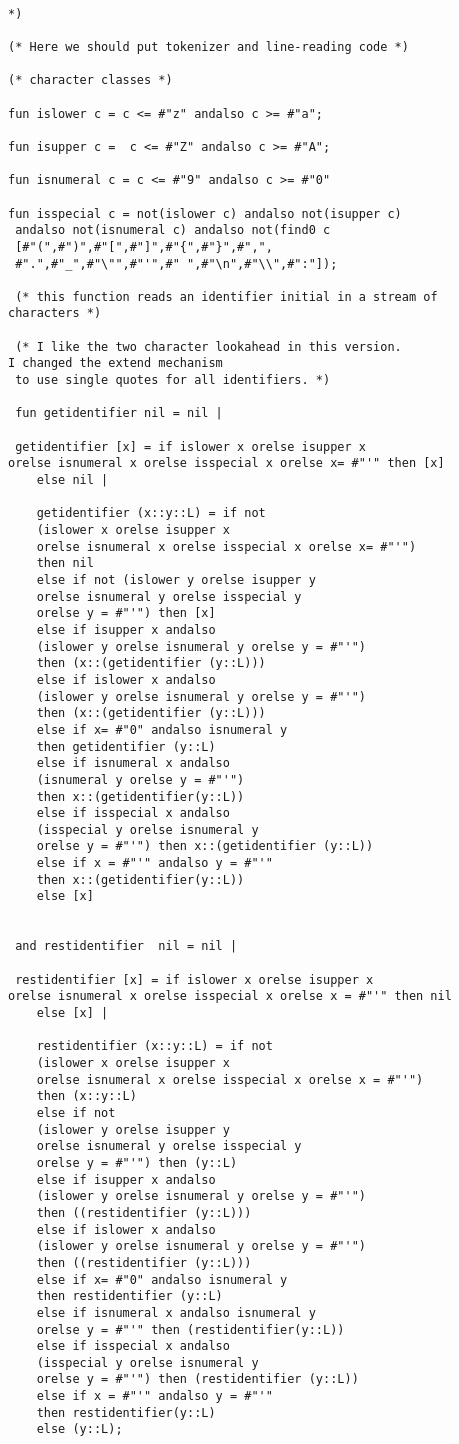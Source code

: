 \documentclass[12pt]{article}
\begin{document}
\begin{verbatim}

*)

(* Here we should put tokenizer and line-reading code *)

(* character classes *)

fun islower c = c <= #"z" andalso c >= #"a";

fun isupper c =  c <= #"Z" andalso c >= #"A";

fun isnumeral c = c <= #"9" andalso c >= #"0"

fun isspecial c = not(islower c) andalso not(isupper c)
 andalso not(isnumeral c) andalso not(find0 c
 [#"(",#")",#"[",#"]",#"{",#"}",#",",
 #".",#"_",#"\"",#"'",#" ",#"\n",#"\\",#":"]);
 
 (* this function reads an identifier initial in a stream of characters *)
 
 (* I like the two character lookahead in this version.  
I changed the extend mechanism
 to use single quotes for all identifiers. *)
 
 fun getidentifier nil = nil |
 
 getidentifier [x] = if islower x orelse isupper x 
orelse isnumeral x orelse isspecial x orelse x= #"'" then [x]
    else nil |
	
	getidentifier (x::y::L) = if not 
	(islower x orelse isupper x 
	orelse isnumeral x orelse isspecial x orelse x= #"'") 
	then nil
	else if not (islower y orelse isupper y 
	orelse isnumeral y orelse isspecial y 
	orelse y = #"'") then [x]
	else if isupper x andalso 
	(islower y orelse isnumeral y orelse y = #"'")
	then (x::(getidentifier (y::L)))
	else if islower x andalso 
	(islower y orelse isnumeral y orelse y = #"'")
	then (x::(getidentifier (y::L)))
	else if x= #"0" andalso isnumeral y 
	then getidentifier (y::L)
	else if isnumeral x andalso 
	(isnumeral y orelse y = #"'") 
	then x::(getidentifier(y::L))
	else if isspecial x andalso 
	(isspecial y orelse isnumeral y 
	orelse y = #"'") then x::(getidentifier (y::L))
	else if x = #"'" andalso y = #"'" 
	then x::(getidentifier(y::L))
	else [x]
	
 
 and restidentifier  nil = nil |
 
 restidentifier [x] = if islower x orelse isupper x 
orelse isnumeral x orelse isspecial x orelse x = #"'" then nil
    else [x] |
	
	restidentifier (x::y::L) = if not 
	(islower x orelse isupper x 
	orelse isnumeral x orelse isspecial x orelse x = #"'") 
	then (x::y::L)
	else if not 
	(islower y orelse isupper y 
	orelse isnumeral y orelse isspecial y 
	orelse y = #"'") then (y::L)
	else if isupper x andalso 
	(islower y orelse isnumeral y orelse y = #"'")
	then ((restidentifier (y::L)))
	else if islower x andalso 
	(islower y orelse isnumeral y orelse y = #"'") 
	then ((restidentifier (y::L)))
	else if x= #"0" andalso isnumeral y 
	then restidentifier (y::L)
	else if isnumeral x andalso isnumeral y 
	orelse y = #"'" then (restidentifier(y::L))
	else if isspecial x andalso 
	(isspecial y orelse isnumeral y 
	orelse y = #"'") then (restidentifier (y::L))
	else if x = #"'" andalso y = #"'" 
	then restidentifier(y::L)
	else (y::L);
 

\end{verbatim}
\end{document}
